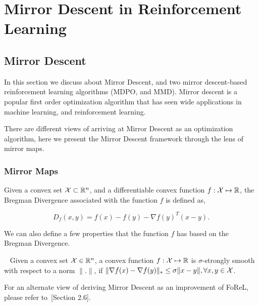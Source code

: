 \chapter{Mirror Descent in Reinforcement Learning}

\section{Mirror Descent}

In this section we discuss about Mirror Descent, and two mirror descent-based reinforcement
learning algorithms (MDPO, and MMD).
Mirror descent is a popular first order optimization algorithm that has seen wide applications in
machine learning, and reinforcement learning.

There are different views of arriving at Mirror Descent as an optimization algorithm, here we
present the Mirror Descent framework through the lens of mirror maps.

\subsection{Mirror Maps}

\begin{definition}
	\label{def:bregman}
	Given a convex set $\mathcal{X} \subset \mathbb{R}^n$, and a differentiable convex function $f: \mathcal{X} \mapsto
		\mathbb{R}$, the Bregman Divergence associated with the function $f$ is defined as,

	$$
		D_f(x, y) = f(x) - f(y) - \nabla f(y)^T (x-y).
	$$
\end{definition}

We can also define a few properties that the function $f$ has based on the Bregman Divergence.
\begin{definition}~\label{def:strsmooth}
	Given a convex set $\mathcal{X} \in \mathbb{R}^n$, a convex function $f: \mathcal{X} \mapsto \mathbb{R}$ is $\sigma$-strongly
	smooth with respect to a norm $\|.
		\|$, if $\|\nabla f(x) - \nabla f(y) \|_{\ast} \leq \sigma \|x - y \|, \forall x, y \in \mathcal{X}$.
\end{definition}

For an alternate view of deriving Mirror Descent as an improvement of FoReL, please refer
to~\cite{shalev-shwartzOnline2012}[Section 2.6].

